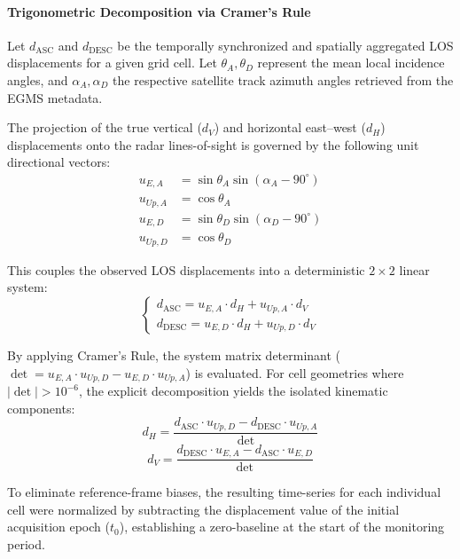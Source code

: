 \documentclass[11pt,a4paper]{article}
\begin{document}
\paragraph{Trigonometric Decomposition via Cramer's Rule}
Let $d_{\text{ASC}}$ and $d_{\text{DESC}}$ be the temporally synchronized and spatially aggregated LOS displacements for a given grid cell. Let $\theta_A, \theta_D$ represent the mean local incidence angles, and $\alpha_A, \alpha_D$ the respective satellite track azimuth angles retrieved from the EGMS metadata. 

The projection of the true vertical ($d_V$) and horizontal east--west ($d_H$) displacements onto the radar lines-of-sight is governed by the following unit directional vectors:
\begin{align}
    u_{E,A} &= \sin\theta_A \sin(\alpha_A - 90^{\circ}) \\
    u_{Up,A} &= \cos\theta_A \\
    u_{E,D} &= \sin\theta_D \sin(\alpha_D - 90^{\circ}) \\
    u_{Up,D} &= \cos\theta_D
\end{align}

This couples the observed LOS displacements into a deterministic $2\times2$ linear system:
\begin{equation}
\begin{cases}
    d_{\text{ASC}} = u_{E,A} \cdot d_H + u_{Up,A} \cdot d_V \\
    d_{\text{DESC}} = u_{E,D} \cdot d_H + u_{Up,D} \cdot d_V
\end{cases}
\end{equation}

By applying Cramer's Rule, the system matrix determinant ($\det = u_{E,A} \cdot u_{Up,D} - u_{E,D} \cdot u_{Up,A}$) is evaluated. For cell geometries where $|\det| > 10^{-6}$, the explicit decomposition yields the isolated kinematic components:
\begin{equation}
    d_H = \frac{d_{\text{ASC}} \cdot u_{Up,D} - d_{\text{DESC}} \cdot u_{Up,A}}{\det}
\end{equation}
\begin{equation}
    d_V = \frac{d_{\text{DESC}} \cdot u_{E,A} - d_{\text{ASC}} \cdot u_{E,D}}{\det}
\end{equation}

To eliminate reference-frame biases, the resulting time-series for each individual cell were normalized by subtracting the displacement value of the initial acquisition epoch ($t_0$), establishing a zero-baseline at the start of the monitoring period.
\end{document}

